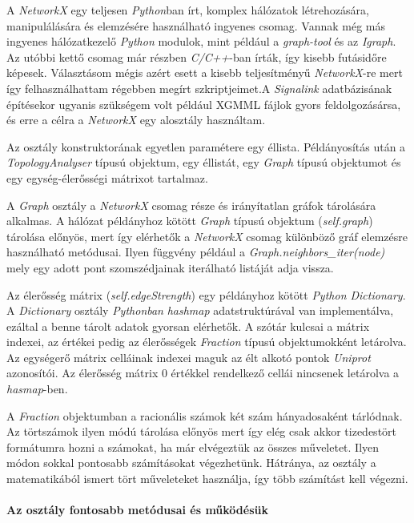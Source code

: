 \documentclass[a4paper,12pt]{article}
\begin{document}
		A \textit{NetworkX} egy teljesen \textit{Python}ban írt, komplex hálózatok létrehozására, manipulálására és elemzésére használható ingyenes csomag. Vannak még más ingyenes hálózatkezelő \textit{Python} modulok, mint például a \textit{graph-tool} és az \textit{Igraph}. Az utóbbi kettő csomag már részben \textit{C/C++}-ban írták, így kisebb futásidőre képesek. Választásom mégis azért esett a kisebb teljesítményű \textit{NetworkX}-re mert így felhasználhattam régebben megírt szkriptjeimet.A \textit{Signalink} adatbázisának építésekor ugyanis szükségem volt például XGMML fájlok gyors feldolgozásársa, és erre a célra a \textit{NetworkX} egy alosztály használtam. 
		
		Az osztály konstruktorának egyetlen paramétere egy éllista. Példányosítás után a \textit{TopologyAnalyser} típusú objektum, egy éllistát, egy \textit{Graph} típusú objektumot és egy egység-élerősségi mátrixot tartalmaz.
		
		A \textit{Graph} osztály a \textit{NetworkX} csomag része és irányítatlan gráfok tárolására alkalmas. A hálózat példányhoz kötött \textit{Graph} típusú objektum (\textit{self.graph}) tárolása előnyös, mert így elérhetők a \textit{NetworkX} csomag különböző gráf elemzésre használható metódusai. Ilyen függvény például a \textit{Graph.neighbors\_iter(node)} mely egy adott pont szomszédjainak iterálható listáját adja vissza.
		
		Az élerősség mátrix (\textit{self.edgeStrength}) egy példányhoz kötött \textit{Python Dictionary}. A \textit{Dictionary} osztály   \textit{Pythonban} \textit{hashmap} adatstruktúrával van implementálva, ezáltal a benne tárolt adatok gyorsan elérhetők. A szótár kulcsai a mátrix indexei, az értékei pedig az élerősségek \textit{Fraction} típusú objektumokként letárolva. Az egységerő mátrix celláinak indexei maguk az élt alkotó pontok \textit{Uniprot} azonosítói. Az élerősség mátrix 0 értékkel rendelkező cellái nincsenek letárolva a \textit{hasmap}-ben.
		
		 A \textit{Fraction} objektumban a racionális számok két szám hányadosaként tárlódnak. Az törtszámok ilyen módú tárolása előnyös mert így elég csak akkor tizedestört formátumra hozni a számokat, ha már elvégeztük az összes műveletet. Ilyen módon sokkal pontosabb számításokat végezhetünk. Hátránya, az osztály a matematikából ismert tört műveleteket használja, így több számítást kell végezni.
		
		\paragraph{Az osztály fontosabb metódusai és működésük}
\end{document}

